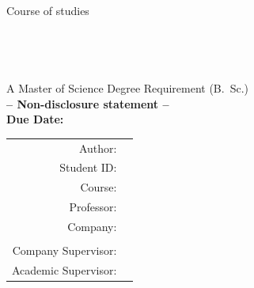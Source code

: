 \begin{titlepage}
\begin{center}
		\large{Course of studies}\\
		\large{\textbf{\courseofstudies}}\\
		\vspace{1.0cm}
		\huge{\textsc{\textbf{\mytitle}}}\\
		\Large{\textbf{\mysubtitle}}\\
		\vspace{1.0cm}
		\large{\textbf{\type}}\\
		\vspace{1.0cm}
		\normalsize{A Master of Science Degree Requirement (B.~Sc.)}\\
		\vspace{1.0cm}
		\textbf{-- Non-disclosure statement --} \\
		\textbf{Due Date: \duedate} \\
		\vspace{2.0cm}
		\begin{tabular}{rl}
			Author:								& \myauthor \\
			Student ID:						& \matrikelnr \\
			Course: 							& \course \\
			Professor:						& \professor \\
			Company: 							& \company \\ \\
			Company Supervisor: 	& \companysupervisor \\
			Academic Supervisor:	& \supervisor \\
		\end{tabular}
	\end{center}
\end{titlepage}
